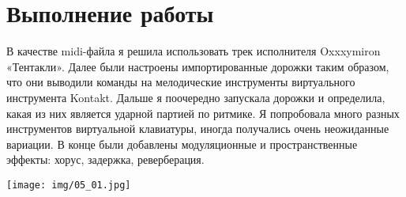 \section{Выполнение работы}

В качестве midi-файла я решила использовать трек исполнителя Oxxxymiron «Тентакли». Далее были настроены импортированные дорожки таким образом, что они выводили команды на мелодические инструменты виртуального инструмента Kontakt.
Дальше я поочередно запускала дорожки и определила, какая из них является ударной партией по ритмике.
Я попробовала много разных инструментов виртуальной клавиатуры, иногда получались очень неожиданные вариации. В конце были добавлены модуляционные и пространственные эффекты: хорус, задержка, реверберация.

\texttt{[image: img/05\_01.jpg]}\\



\pagebreak

